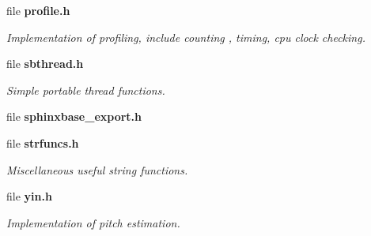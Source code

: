 \begin{DoxyCompactItemize}
\item 
file {\bf profile.\-h}
\begin{DoxyCompactList}\small\item\em Implementation of profiling, include counting , timing, cpu clock checking. \end{DoxyCompactList}\item 
file {\bf sbthread.\-h}
\begin{DoxyCompactList}\small\item\em Simple portable thread functions. \end{DoxyCompactList}\item 
file {\bfseries sphinxbase\-\_\-export.\-h}
\item 
file {\bf strfuncs.\-h}
\begin{DoxyCompactList}\small\item\em Miscellaneous useful string functions. \end{DoxyCompactList}\item 
file {\bf yin.\-h}
\begin{DoxyCompactList}\small\item\em Implementation of pitch estimation. \end{DoxyCompactList}\end{DoxyCompactItemize}
